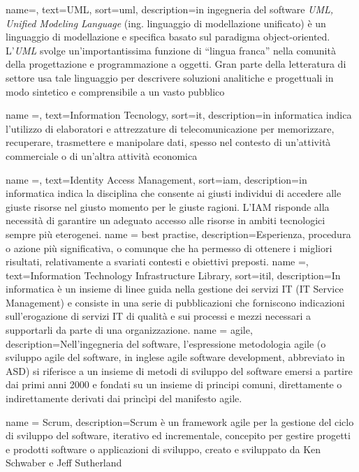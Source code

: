 {
    name=,
    text=UML,
    sort=uml,
    description={in ingegneria del software \emph{UML, Unified Modeling Language} (ing. linguaggio di modellazione unificato) è un linguaggio di modellazione e specifica basato sul paradigma object-oriented. L'\emph{UML} svolge un'importantissima funzione di ``lingua franca'' nella comunità della progettazione e programmazione a oggetti. Gran parte della letteratura di settore usa tale linguaggio per descrivere soluzioni analitiche e progettuali in modo sintetico e comprensibile a un vasto pubblico}
}

{
    name =,
    text=Information Tecnology,
    sort=it,
    description={in informatica indica l'utilizzo di elaboratori e attrezzature di telecomunicazione per memorizzare, recuperare, trasmettere e manipolare dati, spesso nel contesto di un'attività commerciale o di un'altra attività economica}
}

{
    name =,
    text=Identity Access Management,
    sort=iam,
    description={in informatica indica la disciplina che consente ai giusti individui di accedere alle giuste risorse nel giusto
    momento per le giuste ragioni. L’IAM risponde alla necessità di garantire un
    adeguato accesso alle risorse in ambiti tecnologici sempre più eterogenei.}
}
{
    name = best practise,
    description={Esperienza, procedura o azione più significativa, o comunque che ha permesso di
    ottenere i migliori risultati, relativamente a svariati contesti e obiettivi preposti.}
}
{
    name =,
    text=Information
    Technology Infrastructure Library,
    sort=itil,
    description={In informatica è un insieme di linee guida nella gestione dei servizi IT (IT Service Management) e consiste in una serie di pubblicazioni che forniscono indicazioni sull'erogazione di servizi IT di qualità e sui processi e mezzi necessari a supportarli da parte di una organizzazione.}
}
{
    name = agile,
    description={Nell'ingegneria del software, l'espressione metodologia agile (o sviluppo agile del software, in inglese agile software development, abbreviato in ASD) si riferisce a un insieme di metodi di sviluppo del software emersi a partire dai primi anni 2000 e fondati su un insieme di principi comuni, direttamente o indirettamente derivati dai princìpi del manifesto agile.}
}

{
    name = Scrum,
    description={Scrum è un framework agile per la gestione del ciclo di sviluppo del software, iterativo ed incrementale, concepito per gestire progetti e prodotti software o applicazioni di sviluppo, creato e sviluppato da Ken Schwaber e Jeff Sutherland}
}


